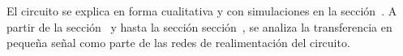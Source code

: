 
\vspace{1.5cm}

El circuito se explica en forma cualitativa y con simulaciones en la sección~. A partir de la sección~ y hasta la sección sección~, se analiza la transferencia en pequeña señal como parte de las redes de realimentación del circuito.

